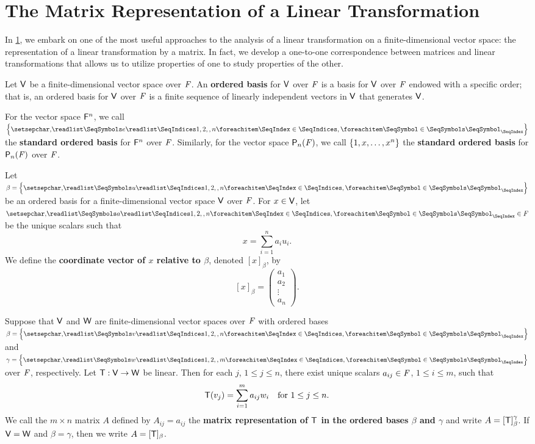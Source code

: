 \section{The Matrix Representation of a Linear Transformation}\label{sec:2.2}

\begin{note}
	In \cref{sec:2.2}, we embark on one of the most useful approaches to the analysis of a linear transformation on a finite-dimensional vector space:
	the representation of a linear transformation by a matrix.
	In fact, we develop a one-to-one correspondence between matrices and linear transformations that allows us to utilize properties of one to study properties of the other.
\end{note}

\begin{defn}\label{2.2.1}
	Let \(\mathsf{V}\) be a finite-dimensional vector space over \(\mathit{F}\).
	An \textbf{ordered basis} for \(\mathsf{V}\) over \(\mathit{F}\) is a basis for \(\mathsf{V}\) over \(\mathit{F}\) endowed with a specific order;
	that is, an ordered basis for \(\mathsf{V}\) over \(\mathit{F}\) is a finite sequence of linearly independent vectors in \(\mathsf{V}\) that generates \(\mathsf{V}\).
\end{defn}

\begin{defn}\label{2.2.2}
	For the vector space \(\mathsf{F}^n\), we call \(\set{\seq{e}{1,2,,n}}\) the \textbf{standard ordered basis} for \(\mathsf{F}^n\) over \(\mathit{F}\).
	Similarly, for the vector space \(\ps[n]{\F}\), we call \(\left\lbrace1, x, \dots, x^n\right\rbrace\) the \textbf{standard ordered basis} for \(\ps[n]{\F}\) over \(\mathit{F}\).
\end{defn}

\begin{defn}\label{2.2.3}
	Let \(\beta = \set{\seq{u}{1,2,,n}}\) be an ordered basis for a finite-dimensional vector space \(\mathsf{V}\) over \(\mathit{F}\).
	For \(x \in \mathsf{V}\), let \(\seq{a}{1,2,,n} \in \F\) be the unique scalars such that
	\[
		x = \sum_{i = 1}^n a_i u_i.
	\]
	We define the \textbf{coordinate vector of \(x\) relative to \(\beta\)}, denoted \([x]_{\beta}\), by
	\[
		[x]_{\beta} = \begin{pmatrix}
			a_1    \\
			a_2    \\
			\vdots \\
			a_n
		\end{pmatrix}.
	\]
\end{defn}

\begin{defn}\label{2.2.4}
	Suppose that \(\mathsf{V}\) and \(\mathsf{W}\) are finite-dimensional vector spaces over \(\mathit{F}\) with ordered bases \(\beta = \set{\seq{v}{1,2,,n}}\) and \(\gamma = \set{\seq{w}{1,2,,m}}\) over \(\mathit{F}\), respectively.
	Let \(\mathsf{T} : \mathsf{V} \to \mathsf{W}\) be linear.
	Then for each \(j\), \(1 \leq j \leq n\), there exist unique scalars \(a_{i j} \in \mathit{F}\), \(1 \leq i \leq m\), such that
	\[
		\mathsf{T}(v_j) = \sum_{i = 1}^m a_{i j} w_i \quad \text{for } 1 \leq j \leq n.
	\]
	We call the \(m \times n\) matrix \(A\) defined by \(A_{i j} = a_{i j}\) the \textbf{matrix representation of \(\mathsf{T}\) in the ordered bases \(\beta\) and \(\gamma\)} and write \(A = [\mathsf{T}]_{\beta}^{\gamma}\).
	If \(\mathsf{V} = \mathsf{W}\) and \(\beta = \gamma\), then we write \(A = [\mathsf{T}]_{\beta}\).
\end{defn}

